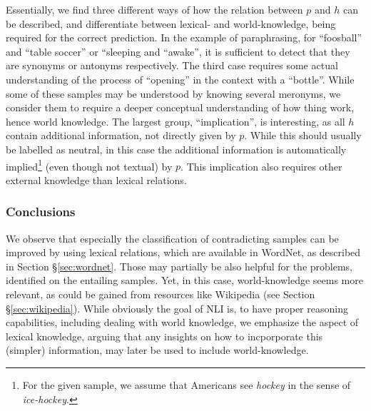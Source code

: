 Essentially, we find three different ways of how the relation between $p$ and $h$ can be described, and differentiate between lexical- and world-knowledge, being required for the correct prediction. In the example of paraphrasing, for ``foosball'' and ``table soccer'' or ``sleeping and ``awake'', it is sufficient to detect that they are synonyms or antonyms respectively. The third case requires some actual understanding of the process of ``opening'' in the context with a ``bottle''. While some of these samples may be understood by knowing several meronyms, we consider them to require a deeper conceptual understanding of how thing work, hence world knowledge. The largest group, ``implication'',   is interesting, as all $h$ contain additional information, not directly given by $p$. While this should usually be labelled as neutral, in this case the additional information is automatically implied\footnote{For the given sample, we assume that Americans see \textit{hockey} in the sense of \textit{ice-hockey}.} (even though not textual) by $p$. This implication also requires other external knowledge than lexical relations.

\subsubsection{Conclusions}
We observe that especially the classification of contradicting samples can be improved by using lexical relations, which are available in WordNet, as described in Section §\ref{sec:wordnet}. Those may partially be also helpful for the problems, identified on the entailing samples. Yet, in this case, world-knowledge seems more relevant, as could be gained from resources like Wikipedia (see Section §\ref{sec:wikipedia}). While obviously the goal of \ac{NLI} is, to have proper reasoning capabilities, including dealing with world knowledge, we emphasize the aspect of lexical knowledge, arguing that any insights on how to incporporate this (simpler) information, may later be used to include world-knowledge.
\newline

